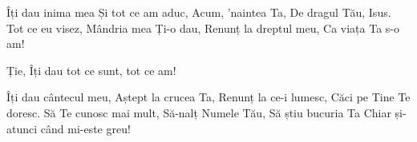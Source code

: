 \beginverse
Îți dau inima mea
Și tot ce am aduc,
Acum, ’naintea Ta,
De dragul Tău, Isus.
Tot ce eu visez,
Mândria mea Ți-o dau,
Renunț la dreptul meu,
Ca viața Ta s-o am!
\endverse

\beginchorus
Ție, Îți dau tot ce sunt, tot ce am!
\endchorus

\beginverse
Îți dau cântecul meu,
Aștept la crucea Ta,
Renunț la ce-i lumesc,
Căci pe Tine Te doresc.
Să Te cunosc mai mult,
Să-nalț Numele Tău,
Să știu bucuria Ta
Chiar și-atunci când mi-este greu!
\endverse
\endsong
